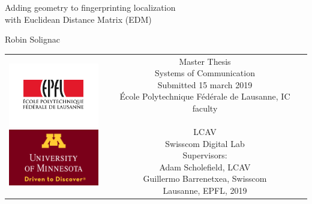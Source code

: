 
\begin{titlepage}
    \begin{center}
    \sffamily
    
    
    \null\vspace{2cm}
    {\huge Adding geometry to fingerprinting localization \\[12pt] with Euclidean Distance Matrix (EDM)} \\[24pt] 
    
    \vspace{3cm}
    
    {\LARGE Robin Solignac}
        
    \vfill
    
    \begin{tabular} {cc}
    \parbox{0.3\textwidth}{\includegraphics[width=4cm]
    {images/epfl} \\[30pt]
    \includegraphics[width=4cm]
    {images/UofM}}
    &
    \parbox{0.7\textwidth}{
        Master Thesis \\
        Systems of Communication\\
        Submitted 15 march 2019\\
        École Polytechnique Fédérale de Lausanne, IC faculty\\
        \\
        LCAV \\
        Swisscom Digital Lab\\[6pt]
    
        Supervisors:\\[4pt]
            Adam Scholefield, LCAV\\
            Guillermo Barrenetxea, Swisscom\\[12pt]
        Lausanne, EPFL, 2019}
    \end{tabular}
    \end{center}
    \vspace{1cm}
    \end{titlepage}
    